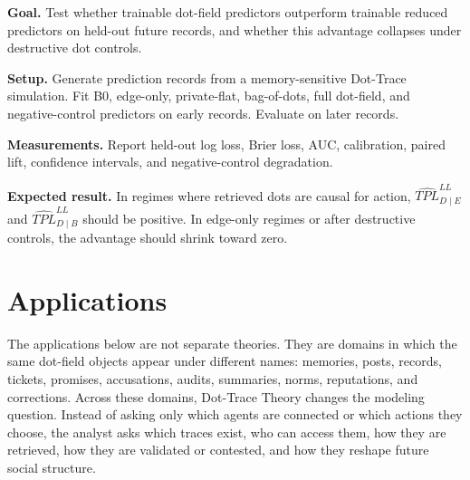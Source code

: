 \documentclass[11pt]{article}
\theoremstyle{remark}
\begin{document}
\textbf{Goal.} Test whether trainable dot-field predictors outperform trainable
reduced predictors on held-out future records, and whether this advantage
collapses under destructive dot controls.

\textbf{Setup.} Generate prediction records from a memory-sensitive Dot-Trace
simulation. Fit B0, edge-only, private-flat, bag-of-dots, full dot-field, and
negative-control predictors on early records. Evaluate on later records.

\textbf{Measurements.} Report held-out log loss, Brier loss, AUC, calibration,
paired lift, confidence intervals, and negative-control degradation.

\textbf{Expected result.} In regimes where retrieved dots are causal for action,
$\widehat{TPL}_{D\mid E}^{LL}$ and $\widehat{TPL}_{D\mid B}^{LL}$ should be
positive. In edge-only regimes or after destructive controls, the advantage
should shrink toward zero.



\section{Applications}\label{applications}

The applications below are not separate theories. They are domains in which the same dot-field objects appear under different names: memories, posts, records, tickets, promises, accusations, audits, summaries, norms, reputations, and corrections. Across these domains, Dot-Trace Theory changes the modeling question. Instead of asking only which agents are connected or which actions they choose, the analyst asks which traces exist, who can access them, how they are retrieved, how they are validated or contested, and how they reshape future social structure.
\end{document}
